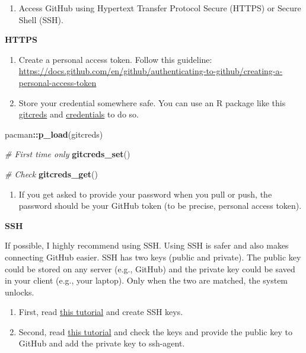 \documentclass[
]{book}
\newenvironment{Shaded}{\begin{snugshade}}{\end{snugshade}}
\newcommand{\CommentTok}[1]{\textcolor[rgb]{0.56,0.35,0.01}{\textit{#1}}}
\newcommand{\KeywordTok}[1]{\textcolor[rgb]{0.13,0.29,0.53}{\textbf{#1}}}
\newcommand{\NormalTok}[1]{#1}
\newcommand{\OperatorTok}[1]{\textcolor[rgb]{0.81,0.36,0.00}{\textbf{#1}}}
\providecommand{\tightlist}{%
  \setlength{\itemsep}{0pt}\setlength{\parskip}{0pt}}
\begin{document}
\begin{enumerate}
\def\labelenumi{\arabic{enumi}.}
\setcounter{enumi}{2}
\tightlist
\item
  Access GitHub using Hypertext Transfer Protocol Secure (HTTPS) or Secure Shell (SSH).
\end{enumerate}

\textbf{HTTPS}

\begin{enumerate}
\def\labelenumi{\arabic{enumi}.}
\item
  Create a personal access token. Follow this guideline: \url{https://docs.github.com/en/github/authenticating-to-github/creating-a-personal-access-token}
\item
  Store your credential somewhere safe. You can use an R package like this \href{https://gitcreds.r-lib.org/}{gitcreds} and \href{https://docs.ropensci.org/credentials/}{credentials} to do so.
\end{enumerate}

\begin{Shaded}
\begin{Highlighting}[]
\NormalTok{pacman}\OperatorTok{::}\KeywordTok{p\_load}\NormalTok{(gitcreds)}

\CommentTok{\# First time only }
\KeywordTok{gitcreds\_set}\NormalTok{()}

\CommentTok{\# Check }
\KeywordTok{gitcreds\_get}\NormalTok{()}
\end{Highlighting}
\end{Shaded}

\begin{enumerate}
\def\labelenumi{\arabic{enumi}.}
\setcounter{enumi}{2}
\tightlist
\item
  If you get asked to provide your password when you pull or push, the password should be your GitHub token (to be precise, personal access token).
\end{enumerate}

\textbf{SSH}

If possible, I highly recommend using SSH. Using SSH is safer and also makes connecting GitHub easier. SSH has two keys (public and private). The public key could be stored on any server (e.g., GitHub) and the private key could be saved in your client (e.g., your laptop). Only when the two are matched, the system unlocks.

\begin{enumerate}
\def\labelenumi{\arabic{enumi}.}
\item
  First, read \href{https://docs.github.com/en/github/authenticating-to-github/connecting-to-github-with-ssh}{this tutorial} and create SSH keys.
\item
  Second, read \href{https://happygitwithr.com/ssh-keys.html}{this tutorial} and check the keys and provide the public key to GitHub and add the private key to ssh-agent.
\end{enumerate}
\end{document}
